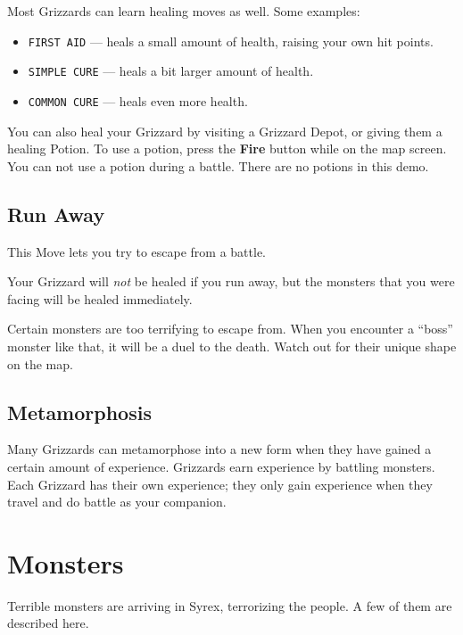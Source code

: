 \documentclass[10pt,twocolumn,openany,article]{memoir}
\begin{document}
\begin{description}
Most Grizzards can learn healing moves as well. Some examples:

\begin{itemize}
\item \texttt{FIRST  AID} ---  heals a small  amount of  health, raising
  your own hit points.
\item \texttt{SIMPLE CURE} --- heals a bit larger amount of health.
\item \texttt{COMMON CURE} --- heals even more health.
\end{itemize}

You can also heal your Grizzard  by visiting a Grizzard Depot, or giving
them a healing  Potion. To use a potion, press  the \textbf{Fire} button
while on  the map  screen. You  can not  use a  potion during  a battle.
\ifdefined\DEMO There are no potions in this demo. \fi

\section{Run Away}

This Move lets you try to escape from a battle.

Your  Grizzard will  \emph{not}  be  healed if  you  run  away, but  the
monsters that you were facing will be healed immediately.

Certain monsters are  too terrifying to escape from.  When you encounter
a ``boss'' monster like that, it will  be a duel to the death. Watch out
for their unique shape on the map.

\section{Metamorphosis}

Many Grizzards  can metamorphose into a  new form when they  have gained
a certain  amount of experience.  Grizzards earn experience  by battling
monsters.  Each  Grizzard  has  their own  experience;  they  only  gain
experience when they travel and do battle as your companion.

\clearpage
\chapter{Monsters}

Terrible monsters are  arriving in Syrex, terrorizing the  people. A few
of them are described here.

\vspace{14pt}


\end{description}
\end{document}
